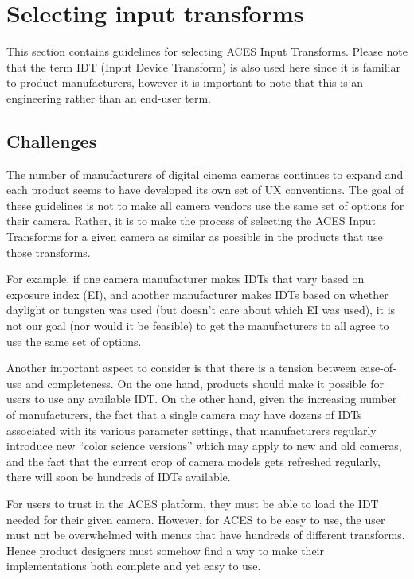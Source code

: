 \numberedformat
\chapter{Selecting input transforms}

This section contains guidelines for selecting ACES Input Transforms. Please note that the term IDT (Input Device Transform) is also used here since it is familiar to product manufacturers, however it is important to note that this is an engineering rather than an end-user term.

\section{Challenges}
The number of manufacturers of digital cinema cameras continues to expand and each product seems to have developed its own set of UX conventions. The goal of these guidelines is not to make all camera vendors use the same set of options for their camera. Rather, it is to make the process of selecting the ACES Input Transforms for a given camera as similar as possible in the products that use those transforms.

For example, if one camera manufacturer makes IDTs that vary based on exposure index (EI), and another manufacturer makes IDTs based on whether daylight or tungsten was used (but doesn’t care about which EI was used), it is not our goal (nor would it be feasible) to get the manufacturers to all agree to use the same set of options.

Another important aspect to consider is that there is a tension between ease-of-use and completeness. On the one hand, products should make it possible for users to use any available IDT. On the other hand, given the increasing number of manufacturers, the fact that a single camera may have dozens of IDTs associated with its various parameter settings, that manufacturers regularly introduce new ``color science versions'' which may apply to new and old cameras, and the fact that the current crop of camera models gets refreshed regularly, there will soon be hundreds of IDTs available.

For users to trust in the ACES platform, they must be able to load the IDT needed for their given camera. However, for ACES to be easy to use, the user must not be overwhelmed with menus that have hundreds of different transforms. Hence product designers must somehow find a way to make their implementations both complete and yet easy to use.

